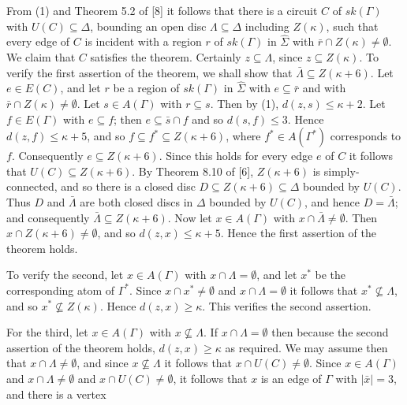 From (1) and Theorem 5.2 of [8] it follows that there is a circuit $C$ of $sk(\Gamma)$ with $U(C) \subseteq \Delta$, bounding an open disc $\Lambda \subseteq \Delta$ including $Z(\kappa)$, such that every edge of $C$ is incident with a region $r$ of $sk(\Gamma)$ in $\hat{\Sigma}$ with $\bar{r} \cap Z(\kappa) \ne \emptyset$. We claim that $C$ satisfies the theorem. Certainly $z \subseteq \Lambda$, since $z \subseteq Z(\kappa)$. To verify the first assertion of the theorem, we shall show that $\bar{\Lambda} \subseteq Z(\kappa + 6)$. Let $e \in E(C)$, and let $r$ be a region of $sk(\Gamma)$ in $\hat{\Sigma}$ with $e \subseteq \bar{r}$ and with $\bar{r} \cap Z(\kappa) \ne \emptyset$. Let $s \in A(\Gamma)$ with $r \subseteq s$. Then by (1), $d(z, s) \le \kappa + 2$. Let $f \in E(\Gamma)$ with $e \subseteq f$; then $e \subseteq \bar{s} \cap f$ and so $d(s, f) \le 3$. Hence $d(z, f) \le \kappa + 5$, and so $f \subseteq f^* \subseteq Z(\kappa + 6)$, where $f^* \in A(\Gamma^*)$ corresponds to $f$. Consequently $e \subseteq Z(\kappa + 6)$. Since this holds for every edge $e$ of $C$ it follows that $U(C) \subseteq Z(\kappa + 6)$. By Theorem 8.10 of [6], $Z(\kappa + 6)$ is simply-connected, and so there is a closed disc $D \subseteq Z(\kappa + 6) \subseteq \Delta$ bounded by $U(C)$. Thus $D$ and $\bar{\Lambda}$ are both closed discs in $\Delta$ bounded by $U(C)$, and hence $D = \bar{\Lambda}$; and consequently $\bar{\Lambda} \subseteq Z(\kappa + 6)$. Now let $x \in A(\Gamma)$ with $x \cap \bar{\Lambda} \ne \emptyset$. Then $x \cap Z(\kappa + 6) \ne \emptyset$, and so $d(z, x) \le \kappa + 5$. Hence the first assertion of the theorem holds.

To verify the second, let $x \in A(\Gamma)$ with $x \cap \Lambda = \emptyset$, and let $x^*$ be the corresponding atom of $\Gamma^*$. Since $x \cap x^* \ne \emptyset$ and $x \cap \Lambda = \emptyset$ it follows that $x^* \nsubseteq \Lambda$, and so $x^* \nsubseteq Z(\kappa)$. Hence $d(z, x) \ge \kappa$. This verifies the second assertion.

For the third, let $x \in A(\Gamma)$ with $x \nsubseteq \Lambda$. If $x \cap \Lambda = \emptyset$ then because the second assertion of the theorem holds, $d(z, x) \ge \kappa$ as required. We may assume then that $x \cap \Lambda \ne \emptyset$, and since $x \nsubseteq \Lambda$ it follows that $x \cap U(C) \ne \emptyset$. Since $x \in A(\Gamma)$ and $x \cap \Lambda \ne \emptyset$ and $x \cap U(C) \ne \emptyset$, it follows that $x$ is an edge of $\Gamma$ with $|\bar{x}| = 3$, and there is a vertex
